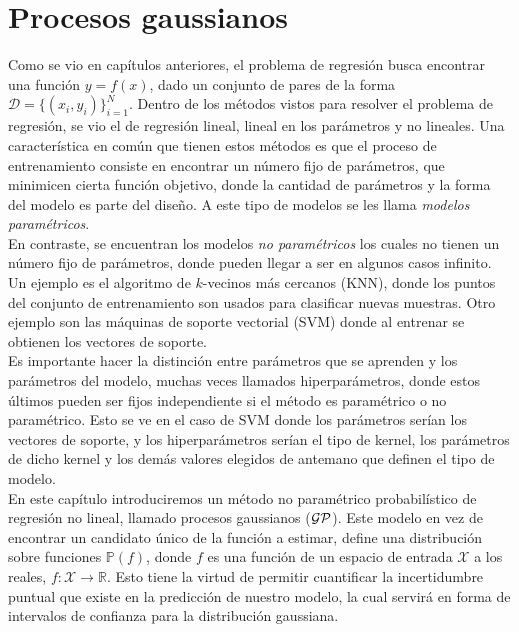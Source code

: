 
\section{Procesos gaussianos}


Como se vio en capítulos anteriores, el problema de regresión busca encontrar una función $y= f(x)$, dado un conjunto de pares de la forma $\mathcal{D}=\{(x_i, y_i)\}_{i=1}^N$. Dentro de los métodos vistos para resolver el problema de regresión, se vio el de regresión lineal, lineal en los parámetros y no lineales. Una característica en común que tienen estos métodos es que el proceso de entrenamiento consiste en encontrar un número fijo de parámetros, que minimicen cierta función objetivo, donde la cantidad de parámetros y la forma del modelo es parte del diseño. A este tipo de modelos se les llama \textit{modelos paramétricos}.\\

En contraste, se encuentran los modelos \textit{no paramétricos} los cuales no tienen un número fijo de parámetros, donde pueden llegar a ser en algunos casos infinito. Un ejemplo es el algoritmo de $k$-vecinos más cercanos (KNN), donde los puntos del conjunto de entrenamiento son usados para clasificar nuevas muestras. Otro ejemplo son las máquinas de soporte vectorial (SVM) donde al entrenar se obtienen los vectores de soporte.\\

Es importante hacer la distinción entre parámetros que se aprenden y los parámetros del modelo, muchas veces llamados hiperparámetros, donde estos últimos pueden ser fijos independiente si el método es paramétrico o no paramétrico. Esto se ve en el caso de SVM donde los parámetros serían los vectores de soporte, y los hiperparámetros serían el tipo de kernel, los parámetros de dicho kernel y los demás valores elegidos de antemano que definen el tipo de modelo.\\

En este capítulo introduciremos un método no paramétrico probabilístico de regresión no lineal, llamado procesos gaussianos ($\mathcal{GP}$). Este modelo en vez de encontrar un candidato único de la función a estimar, define una distribución sobre funciones $\mathbb{P}(f)$, donde $f$ es una función de un espacio de entrada $\mathcal{X}$ a los reales, $f: \mathcal{X} \rightarrow \mathbb{R}$. Esto tiene la virtud de permitir cuantificar la incertidumbre puntual que existe en la predicción de nuestro modelo, la cual servirá en forma de intervalos de confianza para la distribución gaussiana.\\

